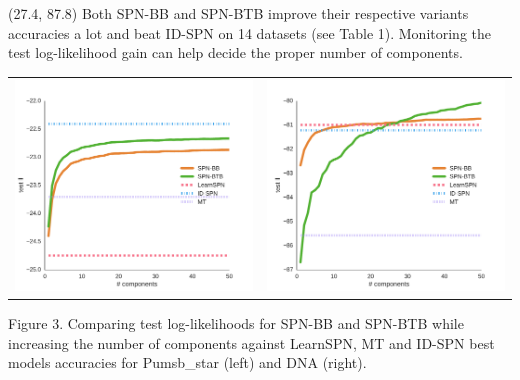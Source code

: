 \documentclass[final]{beamer}
\begin{document}
\begin{frame}{}
\begin{textblock}{25.2}
    

  \end{textblock}
  
  \begin{textblock}{25.2}(27.4, 87.8)
    \footnotesize
    Both \textsf{SPN-BB} and \textsf{SPN-BTB} improve their respective
    variants accuracies a lot and beat \textsf{ID-SPN} on 14 datasets
    (see Table 1). Monitoring the test log-likelihood gain can help
    decide the proper number of components.
    \begin{table}[ht]
      \setlength{\tabcolsep}{30pt}  
      \centering
      \begin{tabular}{c c}
        \includegraphics[width=0.4\linewidth]{figures/curves/pumsb-star-png.pdf}&\includegraphics[width=0.4\linewidth]{figures/curves/dna-png.pdf}
      \end{tabular}
    \end{table}
    \vspace{-20pt}
    \begin{center}
      \begin{minipage}[t]{0.9\linewidth}
        \tiny\flushleft
        Figure 3. Comparing test log-likelihoods for \textsf{SPN-BB} and
        \textsf{SPN-BTB} while increasing the number of components against \textsf{LearnSPN}, \textsf{MT} and
        \textsf{ID-SPN} best models accuracies for Pumsb\_star (left)
        and DNA (right).
      \end{minipage}
    \end{center}
  \end{textblock}
  

\end{frame}
\end{document}
